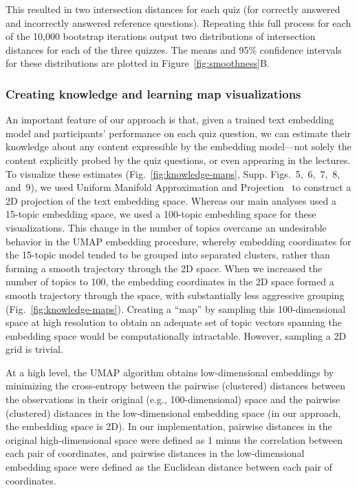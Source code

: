 \documentclass[10pt]{article}
\newcommand{\individualKnowledgeMapsA}{5}
\newcommand{\individualKnowledgeMapsB}{6}
\newcommand{\individualKnowledgeMapsC}{7}
\newcommand{\individualLearningMapsA}{8}
\newcommand{\individualLearningMapsB}{9}
\begin{document}
This resulted in two intersection distances for each quiz (for correctly
answered and incorrectly answered reference questions). Repeating this full
process for each of the 10,000 bootstrap iterations output two distributions of
intersection distances for each of the three quizzes. The means and 95\%
confidence intervals for these distributions are plotted in
Figure~\ref{fig:smoothness}B.

\subsubsection*{Creating knowledge and learning map visualizations}\label{subsec:knowledge-maps}

An important feature of our approach is that, given a trained text embedding
model and participants' performance on each quiz question, we can estimate
their knowledge about any content expressible by the embedding
model---not solely the content explicitly probed by the quiz questions, or even
appearing in the lectures. To visualize these estimates
(Fig.~\ref{fig:knowledge-maps}, Supp.
Figs.~\individualKnowledgeMapsA,~\individualKnowledgeMapsB,~\individualKnowledgeMapsC,~\individualLearningMapsA,
and~\individualLearningMapsB), we used Uniform Manifold Approximation and
Projection~\citep[UMAP; ][]{McInEtal18a, McInEtal18b} to construct a 2D
projection of the text embedding space. Whereas our main analyses used a
15-topic embedding space, we used a 100-topic embedding space for these
visualizations. This change in the number of topics overcame an undesirable
behavior in the UMAP embedding procedure, whereby embedding coordinates for the
15-topic model tended to be grouped into separated clusters, rather than
forming a smooth trajectory through the 2D space. When we increased the number
of topics to 100, the embedding coordinates in the 2D space formed a smooth
trajectory through the space, with substantially less aggressive grouping
(Fig.~\ref{fig:knowledge-maps}). Creating a ``map'' by sampling this
100-dimensional space at high resolution to obtain an adequate set of topic
vectors spanning the embedding space would be computationally intractable.
However, sampling a 2D grid is trivial.

At a high level, the UMAP algorithm obtains low-dimensional embeddings by
minimizing the cross-entropy between the pairwise (clustered) distances between
the observations in their original (e.g., 100-dimensional) space and the
pairwise (clustered) distances in the low-dimensional embedding space (in our
approach, the embedding space is 2D). In our implementation, pairwise distances
in the original high-dimensional space were defined as 1 minus the correlation
between each pair of coordinates, and pairwise distances in the low-dimensional
embedding space were defined as the Euclidean distance between each pair of
coordinates.
\end{document}
